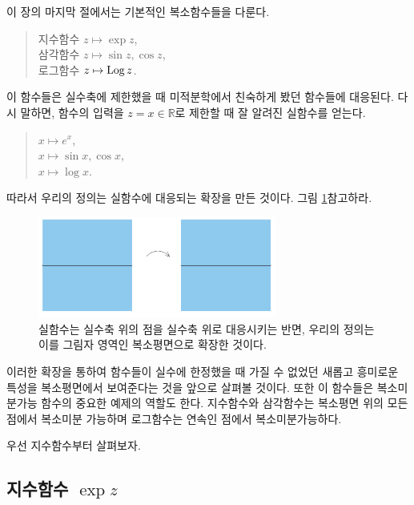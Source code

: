 이 장의 마지막 절에서는 기본적인 복소함수들을 다룬다.
\begin{quote}
지수함수 $z\mapsto \exp z$, \\[1ex]
삼각함수 $z\mapsto \sin z, \cos z$, \\[1ex]
로그함수  $z\mapsto \mathop{\mathrm{Log}} z$.
\end{quote}

이 함수들은 실수축에 제한했을 때
미적분학에서 친숙하게 봤던 함수들에 대응된다.
다시 말하면, 
함수의 입력을 $z=x\in\mathbb R$로 제한할 때
잘 알려진 실함수를 얻는다.
\begin{quote}
$x\mapsto e^x$, \\[1ex]
$x\mapsto \sin x, \cos x$, \\[1ex]
$x\mapsto \log x$.
\end{quote}

따라서 우리의 정의는 실함수에 대응되는 확장을 만든 것이다.
그림 \ref{fig-1-13}\을 참고하라.

\begin{figure}[!h]
\begin{center}
\includegraphics[width=0.7\textwidth]{./SaltChapter/figs/fig-1-13}
\end{center}
\caption{실함수는 실수축 위의 점을 실수축 위로 대응시키는 반면,
우리의 정의는 이를 그림자 영역인 복소평면으로 확장한 것이다.}
\label{fig-1-13}
\end{figure}

이러한 확장을 통하여
함수들이 실수에 한정했을 때 가질 수 없었던 
새롭고 흥미로운 특성을 복소평면에서 보여준다는 것을 앞으로 살펴볼 것이다.
또한 이 함수들은 복소미분가능 함수의 중요한 예제의 역할도 한다.
지수함수와 삼각함수는 복소평면 위의 모든 점에서 복소미분 가능하며
로그함수는 연속인 점에서 복소미분가능하다.

우선  지수함수부터 살펴보자.


\subsection{지수함수 $\exp z$} \label{sec-1-4-1}

